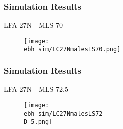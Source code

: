\documentclass{beamer}
\newcommand{\ebh}{\string~/bio.data/bio.lobster/figures/LFA2733Framework2018/} %
\newcommand{\D}{.}
\begin{document}
%
%
%
%





\begin{frame}
\frametitle{Simulation Results}
LFA 27N - MLS 70
\begin{figure}
        \begin{center}
            \texttt{[image: \\ebh sim/LC27NmalesLS70.png]}
        \end{center}
    \end{figure}
\end{frame}


\begin{frame}
\frametitle{Simulation Results}
LFA 27N - MLS 72.5
\begin{figure}
        \begin{center}
            \texttt{[image: \\ebh sim/LC27NmalesLS72\\D 5.png]}
        \end{center}
    \end{figure}
\end{frame}
\end{document}
